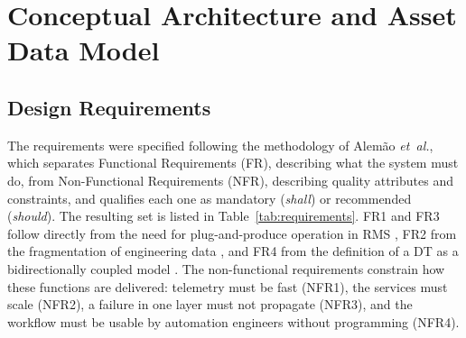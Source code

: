 \documentclass{ieeeojies}
\newcommand{\etal}{\textit{et~al.}}
\begin{document}
\section{Conceptual Architecture and Asset Data Model}
\label{sec:architecture}

\subsection{Design Requirements}
\label{sec:arch_requirements}

The requirements were specified following the methodology of Alem{\~a}o \etal \cite{Alemao2022}, which separates Functional Requirements (FR), describing what the system must do, from Non-Functional Requirements (NFR), describing quality attributes and constraints, and qualifies each one as mandatory (\textit{shall}) or recommended (\textit{should}). The resulting set is listed in Table~\ref{tab:requirements}. FR1 and FR3 follow directly from the need for plug-and-produce operation in RMS \cite{Rocha2024}, FR2 from the fragmentation of engineering data \cite{Gollner2022,Lu2025}, and FR4 from the definition of a DT as a bidirectionally coupled model \cite{Kritzinger2018}. The non-functional requirements constrain how these functions are delivered: telemetry must be fast (NFR1), the services must scale (NFR2), a failure in one layer must not propagate (NFR3), and the workflow must be usable by automation engineers without programming (NFR4).
\end{document}
